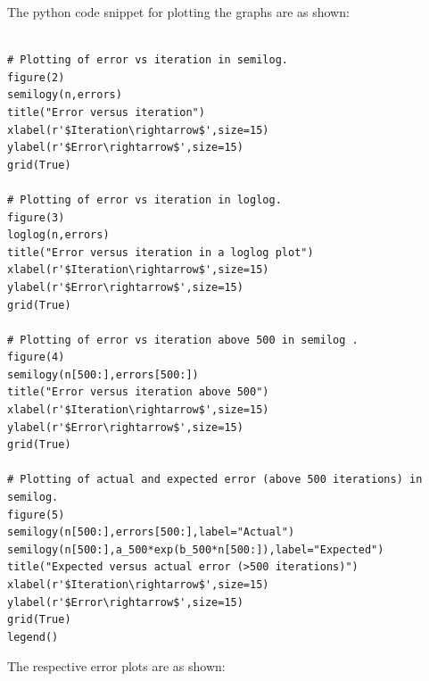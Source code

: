 \documentclass[11pt, a4paper]{article}
\begin{document}
The python code snippet for plotting the graphs are as shown:
 \begin{verbatim}
 
# Plotting of error vs iteration in semilog.
figure(2)
semilogy(n,errors)
title("Error versus iteration")
xlabel(r'$Iteration\rightarrow$',size=15)
ylabel(r'$Error\rightarrow$',size=15)
grid(True)

# Plotting of error vs iteration in loglog.
figure(3)
loglog(n,errors)
title("Error versus iteration in a loglog plot")
xlabel(r'$Iteration\rightarrow$',size=15)
ylabel(r'$Error\rightarrow$',size=15)
grid(True)

# Plotting of error vs iteration above 500 in semilog .
figure(4)
semilogy(n[500:],errors[500:])
title("Error versus iteration above 500")
xlabel(r'$Iteration\rightarrow$',size=15)
ylabel(r'$Error\rightarrow$',size=15)
grid(True)

# Plotting of actual and expected error (above 500 iterations) in semilog.
figure(5)
semilogy(n[500:],errors[500:],label="Actual")
semilogy(n[500:],a_500*exp(b_500*n[500:]),label="Expected")
title("Expected versus actual error (>500 iterations)")
xlabel(r'$Iteration\rightarrow$',size=15)
ylabel(r'$Error\rightarrow$',size=15)
grid(True)
legend()
\end{verbatim}       
\newpage
The respective error plots are as shown:
\end{document}
